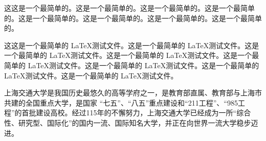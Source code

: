 \documentclass[12pt,a4paper,UTF8,adobefonts]{ctexbook}
\begin{document}
这这是一个最简单的。这是一个最简单的。这是一个最简单的。这是一个最简单的。这是一个最简单的。这是一个最简单的。这是一个最简单的。这是一个最简单的。

这这是一个最简单的 \LaTeX 测试文件。这是一个最简单的 \LaTeX 测试文件。这是一个最简单的 \LaTeX 测试文件。这是一个最简单的 \LaTeX 测试文件。这是一个最简单的 \LaTeX 测试文件。这是一个最简单的 \LaTeX 测试文件。这是一个最简单的 \LaTeX 测试文件。这是一个最简单的 \LaTeX 测试文件。

 上海交通大学是我国历史最悠久的高等学府之一，是教育部直属、教育部与上海市共建的全国重点大学，是国家 “七五”、“八五”重点建设和“211工程”、“985工程”的首批建设高校。经过115年的不懈努力，上海交通大学已经成为一所“综合性、研究型、国际化”的国内一流、国际知名大学，并正在向世界一流大学稳步迈进。 
\end{document}
